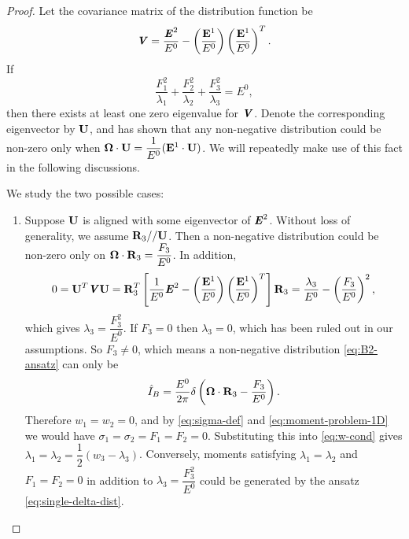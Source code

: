 \begin{proof}
  Let the covariance matrix of the distribution function 
  be
  \[
    \boldsymbol{\mathit{V}} = \dfrac{\boldsymbol{\mathit{E}}^2}{E^0}-\left(\dfrac{\mathbf{E}^1}{E^0}
    \right)\left(\dfrac{\mathbf{E}^1}{E^0}\right)^T.
  \]
  If
  \[
    \dfrac{F_1^2}{\lambda_1} + \dfrac{F_2^2}{\lambda_2}
    + \dfrac{F_3^2}{\lambda_3} = E^0,
  \]
  then there exists at least one zero eigenvalue for $\boldsymbol{\mathit{V}}$.
  Denote the corresponding eigenvector by $\mathbf{U}$, and 
  \cite{kershaw1976flux} has shown that
  any non-negative distribution could be non-zero only when 
  $\boldsymbol{\Omega} \cdot \mathbf{U} = \dfrac1{E^0}(\mathbf{E}^1 \cdot \mathbf{U})$. We
  will repeatedly make use of this fact in the following 
  discussions.

  We study the two possible cases:
  \begin{enumerate}
    \item Suppose $\mathbf{U}$ is aligned with some eigenvector of $\boldsymbol{\mathit{E}}^2$. 
      Without loss of generality, we assume $\mathbf{R}_3\slash\slash\mathbf{U}$. 
      Then a non-negative distribution could be non-zero only on 
      $\boldsymbol{\Omega}\cdot\mathbf{R}_3 = \dfrac{F_3}{E^0}$. In addition,
      \begin{equation}\label{eq:eigenvector-V}
        0 = \bU^T \bbrV \bU = \bR_3^T \left[\dfrac1{E^0} \bbrE^2 - 
          \left(\dfrac{\bE^1}{E^0} \right) \left(\dfrac{\bE^1}{E^0}
        \right)^T\right] \bR_3 = \dfrac{\lambda_3}{E^0} - \left(
        \dfrac{F_3}{E^0} \right)^2,
      \end{equation}
      which gives $\lambda_3 = \dfrac{F_3^2}{E^0}$.
      If $F_3 = 0$ then $\lambda_3 = 0$, which has been 
      ruled out in our assumptions. So $F_3 \not= 0$, which means a non-negative 
      distribution \eqref{eq:B2-ansatz} can only be
      \begin{equation}\label{eq:single-delta-dist}
        \bansatz = \dfrac{E^0}{2 \pi}
        \delta\left(\bOmega\cdot\bR_3 - \dfrac{F_3}{E^0}\right).
      \end{equation}
      Therefore $w_1 = w_2 = 0$, and by \eqref{eq:sigma-def} and 
      \eqref{eq:moment-problem-1D} we would have
      $\sigma_1 = \sigma_2 = F_1 = F_2 = 0$. Substituting this into \eqref{eq:w-cond}
      gives $\lambda_1 = \lambda_2 = \dfrac12(w_3 - \lambda_3)$.
      Conversely, moments satisfying $\lambda_1 = \lambda_2$ and $F_1 = F_2 = 0$
      in addition to $\lambda_3 = \dfrac{F_3^2}{E^0}$ could be generated by the ansatz 
      \eqref{eq:single-delta-dist}. 


\end{enumerate}
\end{proof}
